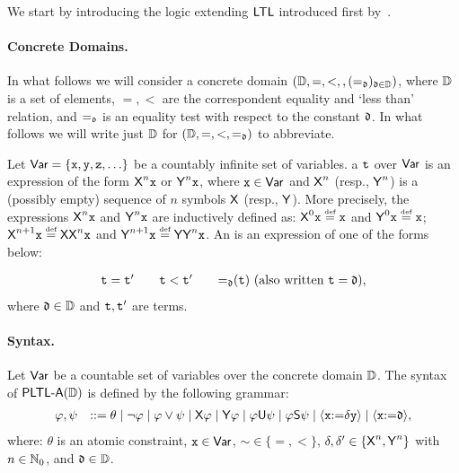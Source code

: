 We start by introducing the logic extending ${\rm\textsf{LTL}}$ introduced first by~\cite{Pnueli77}. 


\paragraph{Concrete Domains.} In what follows we will consider a concrete domain $(\mathbb{D},=,<,,(=_{\mathfrak{d}})_{\mathfrak{d}\in\mathbb{D}})$, where $\mathbb{D}$ is a set of elements, $=,<$ are the correspondent equality and `less than' relation, and $=_{\mathfrak{d}}$ is an equality test with respect to the constant $\mathfrak{d}$.  In what follows we will write just $\mathbb{D}$ for $(\mathbb{D},=,<,=_{\mathfrak{d}})$ to abbreviate.

Let ${\rm \sf Var}=\{\mathtt{x},\mathtt{y},\mathtt{z},\ldots\}$ be a countably infinite set of variables. a  $\mathtt{t}$ over ${\rm \sf Var}$ is an expression of the form ${\operatorname{\sf X}}^n\mathtt{x}$ or ${\operatorname{\sf Y}}^n\mathtt{x}$, where $\mathtt{x}\in{\rm \sf Var}$ and ${\operatorname{\sf X}}^n$ (resp., ${\operatorname{\sf Y}}^n$) is a (possibly empty) sequence of $n$ symbols ${\operatorname{\sf X}}$ (resp., ${\operatorname{\sf Y}}$). 
More precisely, the expressions ${\operatorname{\sf X}}^n\mathtt{x}$ and ${\operatorname{\sf Y}}^n\mathtt{x}$ are inductively defined as: $\Next^0\avar \egdef \avar$ and $\Prev^0\avar \egdef \avar$; $\Next^{n+1}\avar \egdef \Next\Nextn\avar$ and $\Prev^{n+1}\avar \egdef \Prev\Prevn\avar$. 
An  is an expression of one of the forms below:

\[
    \begin{array}{c@{\quad\quad}c@{\quad\quad}c}
        \aterm = \aterm' & \aterm < \aterm' & {=_{\adatum}}(\aterm) \mbox{ (also written $\aterm=\adatum$)},
    \end{array}
\]
where $\mathfrak{d}\in\mathbb{D}$ and $\mathtt{t},\mathtt{t}'$ are terms.

\paragraph{Syntax.} Let ${\rm \sf Var}$ be a countable set of variables over the concrete domain $\mathbb{D}$. The syntax of ${\rm\textsf{PLTL-A}}(\mathbb{D})$ is defined by the following grammar:
\[
    \begin{array}{ll}
    \varphi,\psi & ::= \theta \mid \neg\varphi \mid \varphi \vee \psi \mid {\operatorname{\sf X}}\varphi \mid {\operatorname{\sf Y}}\varphi \mid \varphi {\operatorname{\sf U}} \psi \mid \varphi{\operatorname{\sf S}}\psi \mid \langle{\mathtt{x}{:=}\delta\mathtt{y}}\rangle \mid \langle{\mathtt{x}{:=}\mathfrak{d}}\rangle,
    \end{array}
\]
where: $\theta$ is an atomic constraint, $\mathtt{x}\in{\rm \sf Var}$, ${\sim}\in\{=,<\}$, $\delta,\delta'\in\{{\operatorname{\sf X}}^n,{\operatorname{\sf Y}}^n\}$ with $n\in\mathbb{N}_0$, and $\mathfrak{d}\in\mathbb{D}$.  

